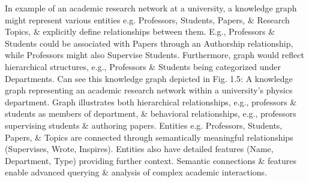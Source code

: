 \documentclass{article}
\begin{document}
\begin{itemize}
\begin{itemize}
\begin{itemize}
\begin{itemize}
                In example of an academic research network at a university, a knowledge graph might represent various entities e.g. Professors, Students, Papers, \& Research Topics, \& explicitly define relationships between them. E.g., Professors \& Students could be associated with Papers through an Authorship relationship, while Professors might also Supervise Students. Furthermore, graph would reflect hierarchical structures, e.g., Professors \& Students being categorized under Departments. Can see this knowledge graph depicted in {\sf Fig. 1.5: A knowledge graph representing an academic research network within a university's physics department. Graph illustrates both hierarchical relationships, e.g., professors \& students as members of department, \& behavioral relationships, e.g., professors supervising students \& authoring papers. Entities e.g. Professors, Students, Papers, \& Topics are connected through semantically meaningful relationships (Supervises, Wrote, Inspires). Entities also have detailed features (Name, Department, Type) providing further context. Semantic connections \& features enable advanced querying \& analysis of complex academic interactions.}


\end{itemize}
\end{itemize}
\end{itemize}
\end{itemize}
\end{document}
